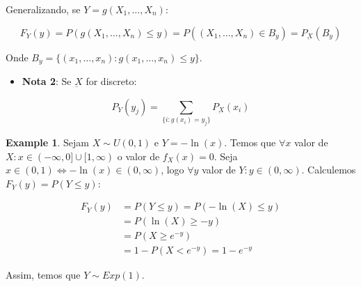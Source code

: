 \documentclass[
]{article}
\providecommand{\tightlist}{%
  \setlength{\itemsep}{0pt}\setlength{\parskip}{0pt}}
\theoremstyle{definition}
\theoremstyle{definition}
\newtheorem{example}{Example}[section]
\theoremstyle{definition}
\theoremstyle{definition}
\theoremstyle{remark}
\begin{document}
Generalizando, se \(Y = g(X_{1},\ldots,X_{n})\):

\begin{equation*}
F_{Y}(y) = P(g(X_{1},\ldots,X_{n}) \le y) = P((X_{1},\ldots,X_{n}) \in B_{y}) = P_{\underbar{X}}(B_{y})
\end{equation*}

Onde \(B_{y} = \{(x_{1},\ldots,x_{n}):g(x_{1},\ldots,x_{n}) \le y\}\).

\begin{itemize}
\tightlist
\item
  \textbf{Nota 2}: Se \(\underbar{X}\) for discreto:
\end{itemize}

\begin{equation*}
P_{Y}(y_{j}) = \sum_{\{i:g(x_{i}) = y_{j}\}}P_{\underbar{X}}(x_{i})
\end{equation*}

\begin{example}
Sejam \(X \sim U(0,1)\) e \(Y = -\ln(x)\). Temos que \(\forall x\) valor de \(X:x \in (-\infty,0] \cup [1,\infty)\) o valor de \(f_{X}(x) = 0\). Seja \(x \in (0,1) \Leftrightarrow -\ln(x) \in (0,\infty)\), logo \(\forall y\) valor de \(Y:y \in (0,\infty)\). Calculemos \(F_{Y}(y) = P(Y \le y)\):

\begin{align*}
F_{Y}(y) &= P(Y \le y) = P(-\ln(X) \le y) \\
&= P(\ln(X) \ge -y) \\
&= P(X \ge e^{-y}) \\
&= 1-P(X < e^{-y}) = 1-e^{-y}
\end{align*}

Assim, temos que \(Y \sim Exp(1)\).
\end{example}
\end{document}
